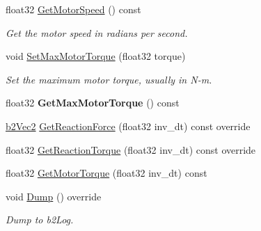 \begin{DoxyCompactItemize}
\mbox{\label{classb2_revolute_joint_abb1fa43d5779a1164ddfedf6130d7ff2}} 
float32 \hyperlink{classb2_revolute_joint_abb1fa43d5779a1164ddfedf6130d7ff2}{Get\+Motor\+Speed} () const
\begin{DoxyCompactList}\small\item\em Get the motor speed in radians per second. \end{DoxyCompactList}\item 
\mbox{\label{classb2_revolute_joint_a41779d7ec05be33e6368ef00123a3581}} 
void \hyperlink{classb2_revolute_joint_a41779d7ec05be33e6368ef00123a3581}{Set\+Max\+Motor\+Torque} (float32 torque)
\begin{DoxyCompactList}\small\item\em Set the maximum motor torque, usually in N-\/m. \end{DoxyCompactList}\item 
\mbox{\label{classb2_revolute_joint_a878308eb3e299e15ac9dc88d48671d51}} 
float32 {\bfseries Get\+Max\+Motor\+Torque} () const
\item 
\hyperlink{structb2_vec2}{b2\+Vec2} \hyperlink{classb2_revolute_joint_abeb7bf941589aed0d7f330a578a62024}{Get\+Reaction\+Force} (float32 inv\+\_\+dt) const override
\item 
float32 \hyperlink{classb2_revolute_joint_aab61a3f330aa93ae28f657e36bc3db51}{Get\+Reaction\+Torque} (float32 inv\+\_\+dt) const override
\item 
float32 \hyperlink{classb2_revolute_joint_a5abafb4d0c1df642f73a5d9faf615e26}{Get\+Motor\+Torque} (float32 inv\+\_\+dt) const
\item 
\mbox{\label{classb2_revolute_joint_a408badabe21b169412a5c4a2f36bbbd8}} 
void \hyperlink{classb2_revolute_joint_a408badabe21b169412a5c4a2f36bbbd8}{Dump} () override
\begin{DoxyCompactList}\small\item\em Dump to b2\+Log. \end{DoxyCompactList}\end{DoxyCompactItemize}
